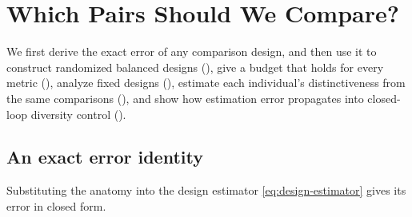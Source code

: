 \documentclass[twoside,11pt]{article}
\newcommand{\SND}{\mu}
\newcommand{\SNDG}{\widehat{\mu}_{G}}
\begin{document}
\section{Which Pairs Should We Compare?}
\label{sec:designs}

We first derive the exact error of any comparison design, and then use it
to construct randomized balanced designs (), give a
budget that holds for every metric (), analyze fixed
designs (), estimate each individual's distinctiveness from the
same comparisons (), and show how estimation error
propagates into closed-loop diversity control ().

\subsection{An exact error identity}

Substituting the anatomy into the design estimator
\eqref{eq:design-estimator} gives its error in closed form.

\end{document}
